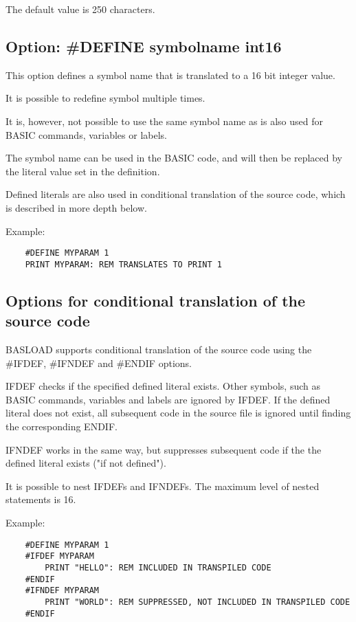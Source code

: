 \documentclass{article}
\begin{document}
        The default value is 250 characters.

    \subsection{Option: \#DEFINE symbolname int16 }
    
        This option defines a symbol name that is translated to
        a 16 bit integer value.

        It is possible to redefine symbol multiple
        times.

        It is, however, not possible to use the same symbol name as is also
        used for BASIC commands, variables or labels.

        The symbol name can be used in the BASIC code, and will
        then be replaced by the literal value set in the definition.

        Defined literals are also used in conditional translation of the source code, which is
        described in more depth below.

        Example:

        \begin{verbatim}
    #DEFINE MYPARAM 1
    PRINT MYPARAM: REM TRANSLATES TO PRINT 1
        \end{verbatim}
    
    \subsection{Options for conditional translation of the source code}
        
        BASLOAD supports conditional translation of the source code using
        the \#IFDEF, \#IFNDEF and \#ENDIF options.

        IFDEF checks if the specified defined literal exists. Other symbols,
        such as BASIC commands, variables and labels are ignored by IFDEF.
        If the defined literal does not exist, all subsequent code in the source
        file is ignored until finding the corresponding ENDIF.

        IFNDEF works in the same way, but suppresses subsequent code if the
        the defined literal exists ("if not defined").

        It is possible to nest IFDEFs and IFNDEFs. The maximum level of nested
        statements is 16.

        Example:

        \begin{verbatim}
    #DEFINE MYPARAM 1
    #IFDEF MYPARAM
        PRINT "HELLO": REM INCLUDED IN TRANSPILED CODE
    #ENDIF
    #IFNDEF MYPARAM
        PRINT "WORLD": REM SUPPRESSED, NOT INCLUDED IN TRANSPILED CODE
    #ENDIF
        \end{verbatim}
    
\end{document}
